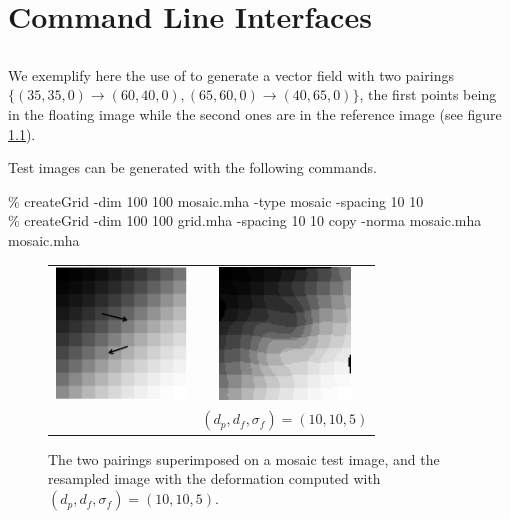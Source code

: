 \chapter{Command Line Interfaces}

\section{\pointmatching}
\label{sec:example:pointmatching}

We exemplify here the use of \pointmatching to generate a vector field with two pairings $\{ 
(35,35,0) \rightarrow (60,40,0),
(65,60,0) \rightarrow (40,65,0) \}$, the first points being in the floating image while the second ones are in the reference image (see figure \ref{fig:exe:pointmatching:1}).

Test images can be generated with the following commands. 
\begin{code}{1}
\% createGrid -dim 100 100 mosaic.mha -type mosaic -spacing 10 10 \\
\% createGrid -dim 100 100 grid.mha -spacing 10 10
copy -norma mosaic.mha mosaic.mha
\end{code}

\begin{figure}[ht]
\begin{center}
\begin{tabular}{cc}
\includegraphics[width=35mm]{use-examples/pointmatching/figures/pairings.png} &
\includegraphics[width=35mm]{use-examples/pointmatching/mosaic-10-10-05.png} \\
&
$(d_p, d_f, \sigma_f) = (10,10,5)$
\end{tabular}
\end{center}
\caption{\label{fig:exe:pointmatching:1} The two pairings superimposed on a mosaic test image, and the resampled image with the deformation computed with $(d_p, d_f, \sigma_f) = (10,10,5)$.}
\end{figure}

